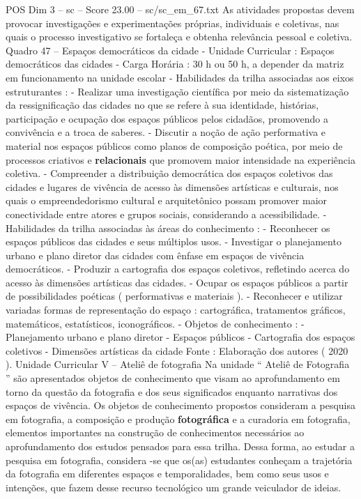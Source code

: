 \begin{textsample}{POS Dim 3 – sc – Score 23.00 – sc/sc\_em\_67.txt}
As atividades propostas devem provocar investigações e experimentações próprias, individuais e coletivas, nas quais o processo investigativo se fortaleça e obtenha relevância pessoal e coletiva.
Quadro 47 – Espaços democráticos da cidade - Unidade Curricular : Espaços democráticos das cidades - Carga Horária : 30 h ou 50 h, a depender da matriz em funcionamento na unidade escolar - Habilidades da trilha associadas aos eixos estruturantes : - Realizar uma investigação científica por meio da sistematização da ressignificação das cidades no que se refere à sua identidade, histórias, participação e ocupação dos espaços públicos pelos cidadãos, promovendo a convivência e a troca de saberes. - Discutir a noção de ação performativa e material nos espaços públicos como planos de composição poética, por meio de processos criativos e \textbf{relacionais} que promovem maior intensidade na experiência coletiva. - Compreender a distribuição democrática dos espaços coletivos das cidades e lugares de vivência de acesso às dimensões artísticas e culturais, nos quais o empreendedorismo cultural e arquitetônico possam promover maior conectividade entre atores e grupos sociais, considerando a acessibilidade. - Habilidades da trilha associadas às áreas do conhecimento : - Reconhecer os espaços públicos das cidades e seus múltiplos usos. - Investigar o planejamento urbano e plano diretor das cidades com ênfase em espaços de vivência democráticos. - Produzir a cartografia dos espaços coletivos, refletindo acerca do acesso às dimensões artísticas das cidades. - Ocupar os espaços públicos a partir de possibilidades poéticas ( performativas e materiais ). - Reconhecer e utilizar variadas formas de representação do espaço : cartográfica, tratamentos gráficos, matemáticos, estatísticos, iconográficos. - Objetos de conhecimento : - Planejamento urbano e plano diretor - Espaços públicos - Cartografia dos espaços coletivos - Dimensões artísticas da cidade Fonte : Elaboração dos autores ( 2020 ).
Unidade Curricular V – Ateliê de fotografia Na unidade “ Ateliê de Fotografia ” são apresentados objetos de conhecimento que visam ao aprofundamento em torno da questão da fotografia e dos seus significados enquanto narrativas dos espaços de vivência.
Os objetos de conhecimento propostos consideram a pesquisa em fotografia, a composição e produção \textbf{fotográfica} e a curadoria em fotografia, elementos importantes na construção de conhecimentos necessários ao aprofundamento dos estudos pensados para essa trilha.
Dessa forma, ao estudar a pesquisa em fotografia, considera -se que os(as) estudantes conheçam a trajetória da fotografia em diferentes espaços e temporalidades, bem como seus usos e intenções, que fazem desse recurso tecnológico um grande veiculador de ideias.

\end{textsample}

